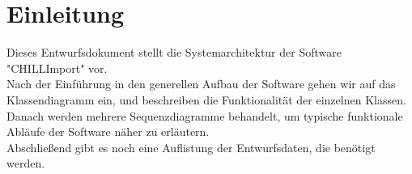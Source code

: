 \section{Einleitung}

Dieses Entwurfsdokument stellt die Systemarchitektur der Software \string"CHILLImport\string" vor.\\
Nach der Einführung in den generellen Aufbau der Software gehen wir auf das Klassendiagramm ein, und beschreiben die Funktionalität der einzelnen Klassen.\\
Danach werden mehrere Sequenzdiagramme behandelt, um typische funktionale Abläufe der Software näher zu erläutern.\\
Abschließend gibt es noch eine Auflistung der Entwurfsdaten, die benötigt werden.
